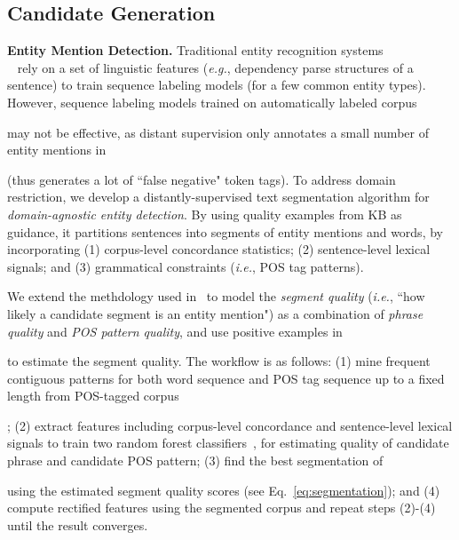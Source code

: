 \documentclass[letterpaper]{sig-alternate-2013}
\def\ie{{\sl i.e.}}
\def\eg{{\sl e.g.}}
\begin{document}
\subsection{Candidate Generation}
\label{subsec:candidate_generation}


\noindent
\textsf{\small\textbf{Entity Mention Detection.}}
Traditional entity recognition systems\\~\cite{finkel2005incorporating,nadeau2007survey} rely on a set of linguistic features (\eg, dependency parse structures of a sentence) to train sequence labeling models (for a few common entity types). However, sequence labeling models trained on automatically labeled corpus \begin{small}\end{small} may not be effective, as distant supervision only annotates a small number of entity mentions in \begin{small}\end{small} (thus generates a lot of ``false negative" token tags). To address domain restriction, we develop a distantly-supervised text segmentation algorithm for \textit{domain-agnostic entity detection}. By using quality examples from KB as guidance, it partitions sentences into segments of entity mentions and words, by incorporating (1) corpus-level concordance statistics; (2) sentence-level lexical signals; and (3) grammatical constraints (\ie, POS tag patterns). 

We extend the methdology used in~\cite{liu2015mining,el2014scalable} to model the \textit{segment quality}  (\ie, ``how likely a candidate segment is an entity mention") as a combination of \textit{phrase quality} and \textit{POS pattern quality}, and use positive examples in \begin{small}\end{small} to estimate the segment quality.
The workflow is as follows: (1) mine frequent contiguous patterns for both word sequence and POS tag sequence up to a fixed length from POS-tagged corpus \begin{small}\end{small}; (2) extract features including corpus-level concordance and sentence-level lexical signals to train two random forest classifiers~\cite{liu2015mining}, for estimating quality of candidate phrase and candidate POS pattern; (3) find the best segmentation of \begin{small}\end{small} using the estimated segment quality scores (see Eq.~\eqref{eq:segmentation}); and (4) compute rectified features using the segmented corpus and repeat steps (2)-(4) until the result converges.
\end{document}
